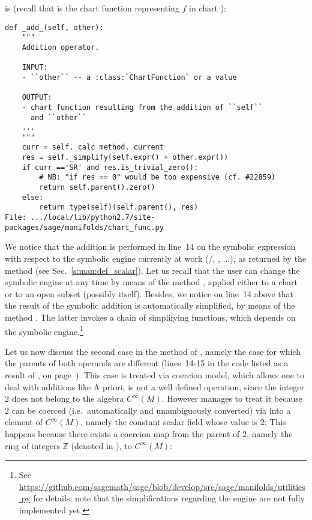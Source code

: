 is (recall that  is the chart function representing $f$ in chart ):
\begin{lstlisting}
def _add_(self, other):
    """
    Addition operator.

    INPUT:
    - ``other`` -- a :class:`ChartFunction` or a value

    OUTPUT:
    - chart function resulting from the addition of ``self``
      and ``other``
    ...
    """
    curr = self._calc_method._current
    res = self._simplify(self.expr() + other.expr())
    if curr =='SR' and res.is_trivial_zero():
        # NB: "if res == 0" would be too expensive (cf. #22859)
        return self.parent().zero()
    else:
        return type(self)(self.parent(), res)
File: .../local/lib/python2.7/site-packages/sage/manifolds/chart_func.py
\end{lstlisting}
We notice that the addition is performed in line~14 on the symbolic expression
with respect to the symbolic engine currently at work (\Sage{}/, , ...), as returned by
the method  (see Sec.~\ref{s:man:def_scalar}).
Let us recall that the user can change the symbolic engine at any time
by means of the method , applied either to
a chart or to an open subset (possibly  itself).
Besides, we notice on line~14 above that the result of the symbolic addition
is automatically simplified, by means of the method .
The latter invokes a chain of simplifying functions, which depends on the
symbolic engine.\footnote{See
\url{https://github.com/sagemath/sage/blob/develop/src/sage/manifolds/utilities.py}
for details; note that the simplifications regarding the  engine are not
fully implemented yet.}

Let us now discuss the second case in the  method of
, namely the case for which the parents of both operands are
different (lines~14-15 in the code listed as a result of ,
on page~\pageref{p:man:list___add__}). This case is treated via \Sage{} coercion model, which allows one to deal with additions like
A priori,  is not a well defined operation, since the integer $2$ does not
belong to the algebra $C^\infty(M)$. However \Sage{} manages to treat it
because $2$ can be coerced (i.e.\ automatically and unambiguously converted) via 
into a element of $C^\infty(M)$, namely the constant scalar field whose value is $2$:
This happens because there exists a coercion map from the parent of $2$, namely the ring of integers $\mathbb{Z}$
(denoted  in \Sage{}), to $C^\infty(M)$:
